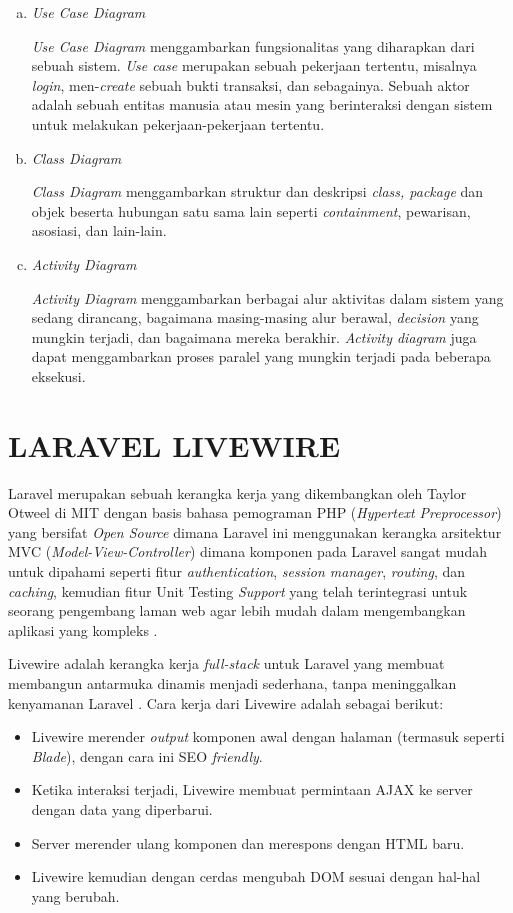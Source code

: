 \begin{enumerate}[a.]
	\item \textit{Use Case Diagram}
	\par \textit{Use Case Diagram} menggambarkan fungsionalitas yang diharapkan dari sebuah sistem. \textit{Use case} merupakan sebuah pekerjaan tertentu, misalnya \textit{login}, men-\textit{create} sebuah bukti transaksi, dan sebagainya. Sebuah aktor adalah sebuah entitas manusia atau mesin yang berinteraksi dengan sistem untuk melakukan pekerjaan-pekerjaan tertentu.
	\item \textit{Class Diagram}
	\par \textit{Class Diagram} menggambarkan struktur dan deskripsi \textit{class, package} dan objek beserta hubungan satu sama lain seperti \textit{containment}, pewarisan, asosiasi, dan lain-lain.
	\item \textit{Activity Diagram}
	\par \textit{Activity Diagram} menggambarkan berbagai alur aktivitas dalam sistem yang sedang dirancang, bagaimana masing-masing alur berawal, \textit{decision} yang mungkin terjadi, dan bagaimana mereka berakhir. \textit{Activity diagram} juga dapat menggambarkan proses paralel yang mungkin terjadi pada beberapa eksekusi.
\end{enumerate}

\section{\uppercase{Laravel Livewire}}
Laravel merupakan sebuah kerangka kerja yang dikembangkan oleh Taylor Otweel di MIT dengan basis bahasa pemograman PHP (\textit{Hypertext Preprocessor}) yang bersifat \textit{Open Source} dimana Laravel ini menggunakan kerangka arsitektur MVC (\textit{Model-View-Controller}) dimana komponen pada Laravel sangat mudah untuk dipahami seperti fitur \textit{authentication}, \textit{session manager}, \textit{routing}, dan \textit{caching}, kemudian fitur Unit Testing \textit{Support} yang telah terintegrasi untuk seorang pengembang laman web agar lebih mudah dalam mengembangkan aplikasi yang kompleks \citep{sebastian2021perancanagan}.

\par Livewire adalah kerangka kerja \textit{full-stack} untuk Laravel yang membuat membangun antarmuka dinamis menjadi sederhana, tanpa meninggalkan kenyamanan Laravel \citep{livewire2021}. Cara kerja dari Livewire adalah sebagai berikut:

\begin{itemize}
	\item Livewire merender \textit{output} komponen awal dengan halaman (termasuk seperti \textit{Blade}), dengan cara ini SEO \textit{friendly}.
	\item Ketika interaksi terjadi, Livewire membuat permintaan AJAX ke server dengan data yang diperbarui.
	\item Server merender ulang komponen dan merespons dengan HTML baru.
	\item Livewire kemudian dengan cerdas mengubah DOM sesuai dengan hal-hal yang berubah.
\end{itemize}

